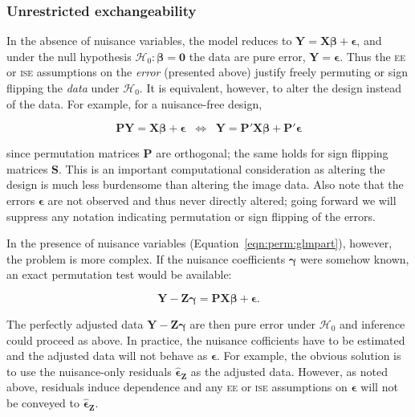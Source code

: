 \subsubsection{Unrestricted exchangeability}
\label{sec:perm:unrestricted}

In the absence of nuisance variables, the model reduces to $\mathbf{Y}=\mathbf{X}\boldsymbol{\beta}+\boldsymbol{\epsilon}$, and under the null hypothesis $\mathcal{H}_0:\boldsymbol{\beta}=\boldsymbol{0}$ the data are pure error, $\mathbf{Y}=\boldsymbol{\epsilon}$.  Thus the \textsc{ee} or \textsc{ise} assumptions on the \emph{error} (presented above) justify freely permuting or sign flipping the \emph{data} under $\mathcal{H}_0$.  It is equivalent, however, to alter the design instead of the data. For example, for a nuisance-free design,

\begin{equation}
\mathbf{P}\mathbf{Y}=\mathbf{X}\boldsymbol{\beta}+\boldsymbol{\epsilon}\;\;\Longleftrightarrow\;\;
\mathbf{Y}=\mathbf{P}'\mathbf{X}\boldsymbol{\beta}+\mathbf{P}'\boldsymbol{\epsilon}
\end{equation}

\noindent
since permutation matrices $\mathbf{P}$ are orthogonal; the same holds for sign flipping matrices $\mathbf{S}$. This is an important computational consideration as altering the design is much less burdensome than altering the image data. Also note that the errors $\boldsymbol{\epsilon}$ are not observed and thus never directly altered; going forward we will suppress any notation indicating permutation or sign flipping of the errors.

In the presence of nuisance variables (Equation~\ref{eqn:perm:glmpart}), however, the problem is more complex. If the nuisance coefficients $\boldsymbol{\gamma}$ were somehow known, an exact permutation test would be available:

\begin{equation}
\mathbf{Y} - \mathbf{Z}\boldsymbol{\gamma} = \mathbf{P}\mathbf{X}\boldsymbol{\beta} + \boldsymbol{\epsilon}.
\end{equation}

The perfectly adjusted data $\mathbf{Y} - \mathbf{Z}\boldsymbol{\gamma}$ are then pure error under $\mathcal{H}_0$ and inference could proceed as above. In practice, the nuisance cofficients have to be estimated and the adjusted data will not behave as $\boldsymbol{\epsilon}$.  For example, the obvious solution is to use the nuisance-only residuals $\boldsymbol{\hat{\epsilon}}_{\mathbf{Z}}$ as the adjusted data.  However, as noted above, residuals induce dependence and any \textsc{ee} or \textsc{ise} assumptions on $\boldsymbol{\epsilon}$ will not be conveyed to $\boldsymbol{\hat{\epsilon}}_{\mathbf{Z}}$.

